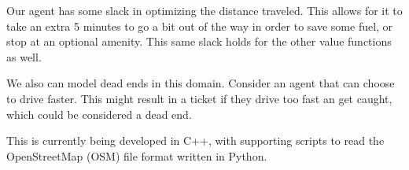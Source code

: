 Our agent has some slack in optimizing the distance traveled. This allows for it to take an extra 5 minutes to go a bit out of the way in order to save some fuel, or stop at an optional amenity. This same slack holds for the other value functions as well.

We also can model dead ends in this domain. Consider an agent that can choose to drive faster. This might result in a ticket if they drive too fast an get caught, which could be considered a dead end.

This is currently being developed in C++, with supporting scripts to read the OpenStreetMap (OSM) file format written in Python.
